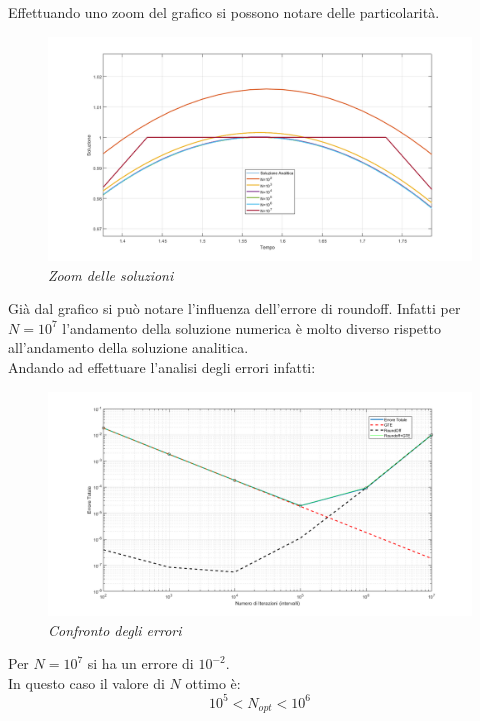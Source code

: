 Effettuando uno zoom del grafico si possono notare delle particolarità.
\begin{figure}[H]
	\centering   
	\includegraphics[width=\textwidth]{matlab/esercizio2_soluzioni_zoom1.png}
	\caption{\textit{Zoom delle soluzioni}}
\end{figure}
Già dal grafico si può notare l'influenza dell'errore di roundoff. Infatti per $N=10^7$ l'andamento della soluzione numerica è molto diverso rispetto all'andamento della soluzione analitica.
\\Andando ad effettuare l'analisi degli errori infatti:
\begin{figure}[H]
	\centering   
	\includegraphics[width=\textwidth]{matlab/esercizio2_errori_confronto.png}
	\caption{\textit{Confronto degli errori}}
\end{figure}
Per $N=10^7$ si ha un errore di $10^{-2}$. 
\\In questo caso il valore di $N$ ottimo è:
\begin{equation*}
	10^5 < N_{opt} < 10^6
\end{equation*}
